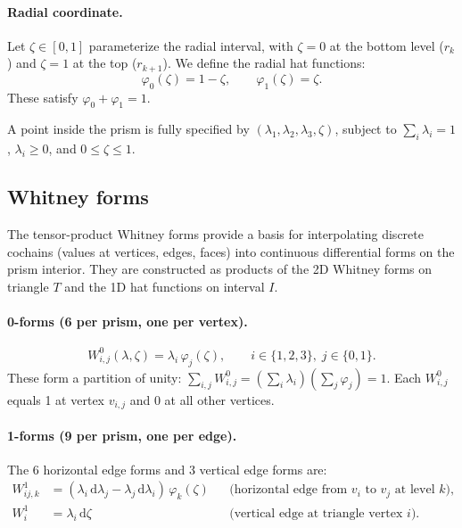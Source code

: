\documentclass[11pt,a4paper]{article}
\newcommand{\dd}{\mathrm{d}}
\begin{document}
\paragraph{Radial coordinate.}
Let $\zeta \in [0,1]$ parameterize the radial interval, with $\zeta = 0$
at the bottom level ($r_k$) and $\zeta = 1$ at the top ($r_{k+1}$). We define
the radial hat functions:
\begin{equation}
  \varphi_0(\zeta) = 1 - \zeta, \qquad \varphi_1(\zeta) = \zeta.
  \label{eq:hat_functions}
\end{equation}
These satisfy $\varphi_0 + \varphi_1 = 1$.

A point inside the prism is fully specified by $(\lambda_1, \lambda_2,
\lambda_3, \zeta)$, subject to $\sum_i \lambda_i = 1$, $\lambda_i \geq 0$,
and $0 \leq \zeta \leq 1$.

\subsection{Whitney forms}
\label{sec:whitney}

The tensor-product Whitney forms provide a basis for interpolating discrete
cochains (values at vertices, edges, faces) into continuous differential forms
on the prism interior. They are constructed as products of the 2D Whitney forms
on triangle $T$ and the 1D hat functions on interval $I$.

\paragraph{0-forms (6 per prism, one per vertex).}
\begin{equation}
  W^0_{i,j}(\lambda, \zeta) = \lambda_i \, \varphi_j(\zeta), \qquad
  i \in \{1,2,3\},\; j \in \{0,1\}.
  \label{eq:W0}
\end{equation}
These form a partition of unity:
$\sum_{i,j} W^0_{i,j} = (\sum_i \lambda_i)(\sum_j \varphi_j) = 1$.
Each $W^0_{i,j}$ equals 1 at vertex $v_{i,j}$ and 0 at all other vertices.

\paragraph{1-forms (9 per prism, one per edge).}
The 6 horizontal edge forms and 3 vertical edge forms are:
\begin{align}
  W^1_{ij,k} &= (\lambda_i \, \dd\lambda_j - \lambda_j \, \dd\lambda_i)
    \,\varphi_k(\zeta)
  && \text{(horizontal edge from $v_i$ to $v_j$ at level $k$)},
  \label{eq:W1h} \\
  W^1_i &= \lambda_i \, \dd\zeta
  && \text{(vertical edge at triangle vertex $i$)}.
  \label{eq:W1v}
\end{align}
\end{document}
